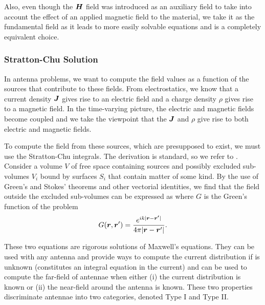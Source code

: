 Also, even though the $\boldsymbol{H}$ field was introduced as an auxiliary field to take
into account the effect of an applied magnetic field to the material, we 
take it as the fundamental field as it leads to more easily solvable
equations and is a completely equivalent choice. 

\subsubsection{Stratton-Chu Solution}
In antenna problems, we want to compute the field values as a function of 
the sources that contribute to these fields. From electrostatics, we know 
that a current density $\boldsymbol{J}$ gives rise to an electric field and a charge 
density $\rho$ gives rise to a magnetic field. In the time-varying picture, 
the electric and magnetic fields become coupled and we take the viewpoint that
the $\boldsymbol{J}$ and $\rho$ give rise to both electric and magnetic fields. 

To compute the field from these sources, which are presupposed to exist, 
we must use the Stratton-Chu integrals. The derivation is standard, so we 
refer to \cite{ELL2003}. Consider a volume $V$ of free space containing
sources and possibly excluded sub-volumes $V_i$ bound by surfaces $S_i$ that contain matter
of some kind. By the use of Green's and Stokes' theorems and other vectorial 
identities, we find that the field outside the excluded sub-volumes
can be expressed as
where $G$ is the Green's function of the problem
  \begin{equation}
   G(\boldsymbol{r},\boldsymbol{r}') = \frac{e^{ik|\boldsymbol{r}-\boldsymbol{r'}|}}{4\pi|\boldsymbol{r}-\boldsymbol{r}'|}.
  \end{equation}

These two equations are rigorous solutions of Maxwell's equations. 
They can be used with any antenna and provide ways to compute the 
current distribution if is unknown (constitutes an integral equation in the current)
and can be used to compute the far-field of antennae when either 
(i) the current distribution is known or (ii) the near-field around the antenna
is known. 
These two properties discriminate antennae into two categories, denoted Type I and Type II.

